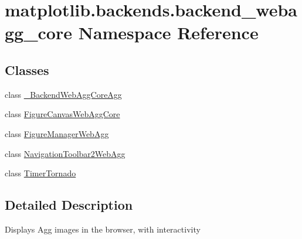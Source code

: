 \hypertarget{namespacematplotlib_1_1backends_1_1backend__webagg__core}{}\section{matplotlib.\+backends.\+backend\+\_\+webagg\+\_\+core Namespace Reference}
\label{namespacematplotlib_1_1backends_1_1backend__webagg__core}
\subsection*{Classes}
\begin{DoxyCompactItemize}
\item 
class \hyperlink{classmatplotlib_1_1backends_1_1backend__webagg__core_1_1__BackendWebAggCoreAgg}{\+\_\+\+Backend\+Web\+Agg\+Core\+Agg}
\item 
class \hyperlink{classmatplotlib_1_1backends_1_1backend__webagg__core_1_1FigureCanvasWebAggCore}{Figure\+Canvas\+Web\+Agg\+Core}
\item 
class \hyperlink{classmatplotlib_1_1backends_1_1backend__webagg__core_1_1FigureManagerWebAgg}{Figure\+Manager\+Web\+Agg}
\item 
class \hyperlink{classmatplotlib_1_1backends_1_1backend__webagg__core_1_1NavigationToolbar2WebAgg}{Navigation\+Toolbar2\+Web\+Agg}
\item 
class \hyperlink{classmatplotlib_1_1backends_1_1backend__webagg__core_1_1TimerTornado}{Timer\+Tornado}
\end{DoxyCompactItemize}


\subsection{Detailed Description}
\begin{DoxyVerb}Displays Agg images in the browser, with interactivity
\end{DoxyVerb}
 